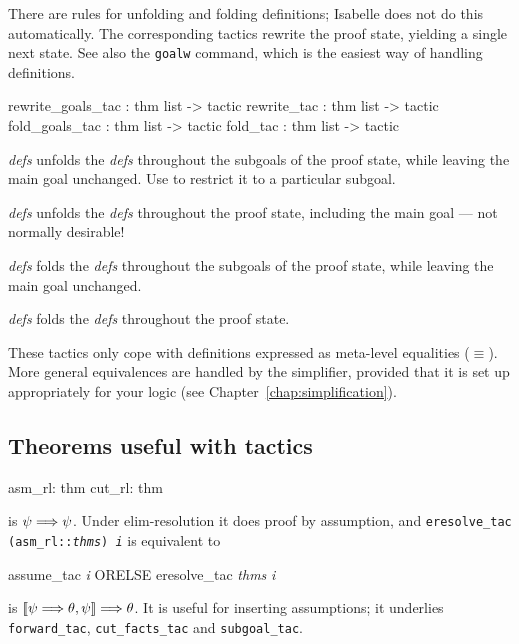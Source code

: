 There are rules for unfolding and folding definitions; Isabelle does not do
this automatically.  The corresponding tactics rewrite the proof state,
yielding a single next state.  See also the {\tt goalw} command, which is the
easiest way of handling definitions.
\begin{ttbox} 
rewrite_goals_tac : thm list -> tactic
rewrite_tac       : thm list -> tactic
fold_goals_tac    : thm list -> tactic
fold_tac          : thm list -> tactic
\end{ttbox}
\begin{ttdescription}
\item[\ttindexbold{rewrite_goals_tac} {\it defs}]  
unfolds the {\it defs} throughout the subgoals of the proof state, while
leaving the main goal unchanged.  Use  to restrict it to a
particular subgoal.

\item[\ttindexbold{rewrite_tac} {\it defs}]  
unfolds the {\it defs} throughout the proof state, including the main goal
--- not normally desirable!

\item[\ttindexbold{fold_goals_tac} {\it defs}]  
folds the {\it defs} throughout the subgoals of the proof state, while
leaving the main goal unchanged.

\item[\ttindexbold{fold_tac} {\it defs}]  
folds the {\it defs} throughout the proof state.
\end{ttdescription}

\begin{warn}
  These tactics only cope with definitions expressed as meta-level
  equalities ($\equiv$).  More general equivalences are handled by the
  simplifier, provided that it is set up appropriately for your logic
  (see Chapter~\ref{chap:simplification}).
\end{warn}

\subsection{Theorems useful with tactics}
\begin{ttbox} 
asm_rl: thm 
cut_rl: thm 
\end{ttbox}
\begin{ttdescription}
\item[\tdx{asm_rl}] 
is $\psi\Longrightarrow\psi$.  Under elim-resolution it does proof by assumption, and
\hbox{\tt eresolve_tac (asm_rl::{\it thms}) {\it i}} is equivalent to
\begin{ttbox} 
assume_tac {\it i}  ORELSE  eresolve_tac {\it thms} {\it i}
\end{ttbox}

\item[\tdx{cut_rl}] 
is $\mathopen{[\![}\psi\Longrightarrow\theta,\psi\mathclose{]\!]}\Longrightarrow\theta$.  It is useful for inserting
assumptions; it underlies {\tt forward_tac}, {\tt cut_facts_tac}
and {\tt subgoal_tac}.
\end{ttdescription}


